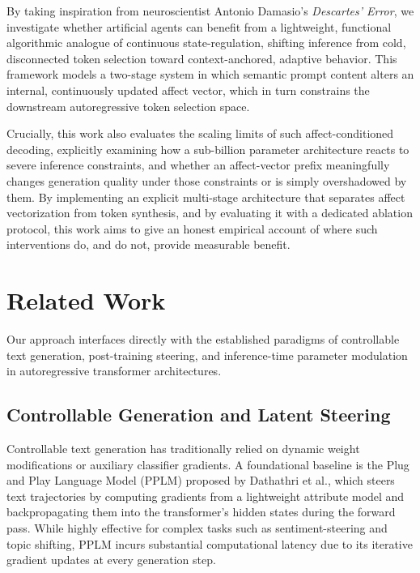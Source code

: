 \documentclass[10pt,twocolumn]{article}
\begin{document}
By taking inspiration from neuroscientist Antonio Damasio's \textit{Descartes' Error}, we investigate whether artificial agents can benefit from a lightweight, functional algorithmic analogue of continuous state-regulation, shifting inference from cold, disconnected token selection toward context-anchored, adaptive behavior. This framework models a two-stage system in which semantic prompt content alters an internal, continuously updated affect vector, which in turn constrains the downstream autoregressive token selection space.

Crucially, this work also evaluates the scaling limits of such affect-conditioned decoding, explicitly examining how a sub-billion parameter architecture reacts to severe inference constraints, and whether an affect-vector prefix meaningfully changes generation quality under those constraints or is simply overshadowed by them. By implementing an explicit multi-stage architecture that separates affect vectorization from token synthesis, and by evaluating it with a dedicated ablation protocol, this work aims to give an honest empirical account of where such interventions do, and do not, provide measurable benefit.


\section{Related Work}
Our approach interfaces directly with the established paradigms of controllable text generation, post-training steering, and inference-time parameter modulation in autoregressive transformer architectures.

\subsection{Controllable Generation and Latent Steering}
Controllable text generation has traditionally relied on dynamic weight modifications or auxiliary classifier gradients. A foundational baseline is the Plug and Play Language Model (PPLM) proposed by Dathathri et al., which steers text trajectories by computing gradients from a lightweight attribute model and backpropagating them into the transformer's hidden states during the forward pass. While highly effective for complex tasks such as sentiment-steering and topic shifting, PPLM incurs substantial computational latency due to its iterative gradient updates at every generation step.
\end{document}
